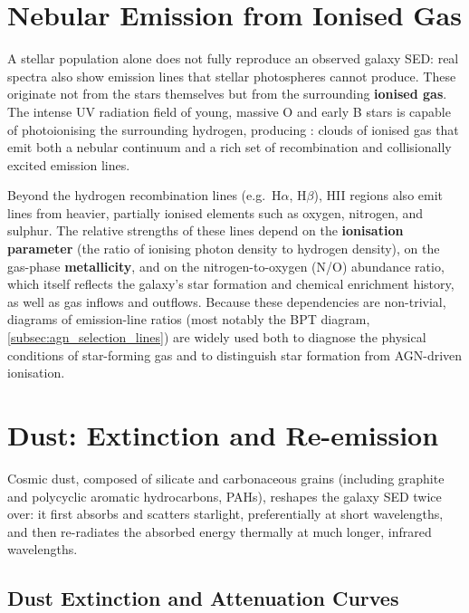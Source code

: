 \section{Nebular Emission from Ionised Gas} \label{sec:nebular_emission}

A stellar population alone does not fully reproduce an observed galaxy SED: real spectra also show emission lines that stellar photospheres cannot produce. These originate not from the stars themselves but from the surrounding \textbf{ionised gas}. The intense UV radiation field of young, massive O and early B stars is capable of photoionising the surrounding hydrogen, producing : clouds of ionised gas that emit both a nebular continuum and a rich set of recombination and collisionally excited emission lines.

\medskip

Beyond the hydrogen recombination lines (e.g.\ H$\alpha$, H$\beta$), HII regions also emit lines from heavier, partially ionised elements such as oxygen, nitrogen, and sulphur. The relative strengths of these lines depend on the \textbf{ionisation parameter} (the ratio of ionising photon density to hydrogen density), on the gas-phase \textbf{metallicity}, and on the nitrogen-to-oxygen (N/O) abundance ratio, which itself reflects the galaxy's star formation and chemical enrichment history, as well as gas inflows and outflows. Because these dependencies are non-trivial, diagrams of emission-line ratios (most notably the BPT diagram, \cref{subsec:agn_selection_lines}) are widely used both to diagnose the physical conditions of star-forming gas and to distinguish star formation from AGN-driven ionisation.

\section{Dust: Extinction and Re-emission} \label{sec:dust_seds}

Cosmic dust, composed of silicate and carbonaceous grains (including graphite and polycyclic aromatic hydrocarbons, PAHs), reshapes the galaxy SED twice over: it first absorbs and scatters starlight, preferentially at short wavelengths, and then re-radiates the absorbed energy thermally at much longer, infrared wavelengths.

\subsection{Dust Extinction and Attenuation Curves} \label{subsec:dust_extinction}


